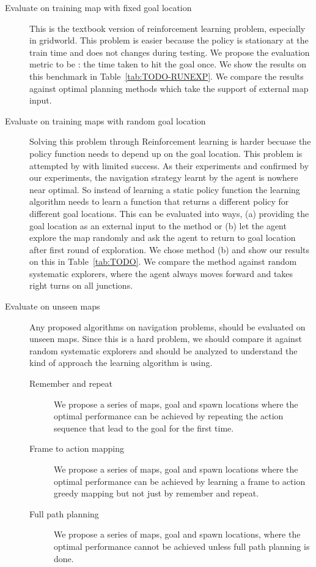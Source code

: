 \begin{description}
  \item[Evaluate on training map with fixed goal location]
    This is the textbook version of reinforcement learning problem,
    especially in gridworld. This problem is easier because the policy
    is stationary at the train time and does not changes during
    testing.
    We propose the evaluation metric to be : the time taken to hit the goal once. We show the results on this benchmark in Table~\ref{tab:TODO-RUNEXP}.
    We compare the results against optimal planning methods which take the support of external map input.
  \item [Evaluate on training maps with random goal location]
    Solving this problem through Reinforcement learning is harder becuase the policy function needs to depend up on the goal location.
    This problem is attempted by \cite{MiPaViICLR2017} with limited success.
    As their experiments and confirmed by our experiments, the navigation strategy learnt by the agent is nowhere near optimal.
    So instead of learning a static policy function the learning algorithm needs to learn a function that returns a different policy for different goal locations.
    This can be evaluated into ways, (a) providing the goal location as an external input to the method or (b) let the agent explore the map randomly and ask the agent to return to goal location after first round of exploration.
    We chose method (b) and show our results on this in Table~\ref{tab:TODO}.
    We compare the method against random systematic explorers, where the agent always moves forward and takes right turns on all junctions.
  \item [Evaluate on unseen maps]
    Any proposed algorithms on navigation problems, should be evaluated on unseen maps.
    Since this is a hard problem, we should compare it against random systematic explorers and should be analyzed to understand the kind of approach the learning algorithm is using.
    \begin{description}
      \item[Remember and repeat]
        We propose a series of maps, goal and spawn locations where the optimal performance can be achieved by repeating the action sequence that lead to the goal for the first time.
      \item[Frame to action mapping]
        We propose a series of maps, goal and spawn locations where the optimal performance can be achieved by learning a frame to action greedy mapping but not just by remember and repeat.
      \item[Full path planning]
        We propose a series of maps, goal and spawn locations, where the optimal performance cannot be achieved unless full path planning is done.
    \end{description}
\end{description}

